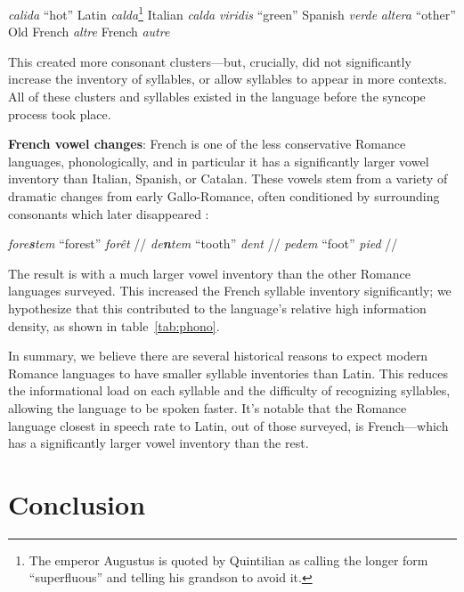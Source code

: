 \documentclass[12pt,twoside]{article}
\newcommand{\ipa}[1]{/\textipa{#1}/}
\newcommand{\yields}{\textrightarrow}
\begin{document}
\begin{exe}
\ex \emph{calida} ``hot'' \yields{} Latin \emph{calda}\footnote{The emperor Augustus is quoted by Quintilian \citep[I.6.19]{quintilian} as calling the longer form ``superfluous'' and telling his grandson to avoid it.} \yields{} Italian \emph{calda}
\ex \emph{viridis} ``green'' \yields{} Spanish \emph{verde}
\ex \emph{altera} ``other'' \yields{} Old French \emph{altre} \yields{} French \emph{autre}
\end{exe}

This created more consonant clusters---but, crucially, did not significantly increase the inventory of syllables, or allow syllables to appear in more contexts. All of these clusters and syllables existed in the language before the syncope process took place.

\textbf{French vowel changes}: French is one of the less conservative Romance languages, phonologically, and in particular it has a significantly larger vowel inventory than Italian, Spanish, or Catalan. These vowels stem from a variety of dramatic changes from early Gallo-Romance, often conditioned by surrounding consonants which later disappeared \citep{pope}:

\begin{exe}
\ex \emph{fore\textbf{s}tem} ``forest'' \yields{} \emph{for\^et} \ipa{fOKE}
\ex \emph{de\textbf{n}tem} ``tooth'' \yields{} \emph{dent} \ipa{d\~A}
\ex \emph{pedem} ``foot'' \yields{} \emph{pied} \ipa{pje}
\end{exe}

The result is with a much larger vowel inventory than the other Romance languages surveyed. This increased the French syllable inventory significantly; we hypothesize that this contributed to the language's relative high information density, as shown in table~\ref{tab:phono}.

In summary, we believe there are several historical reasons to expect modern Romance languages to have smaller syllable inventories than Latin. This reduces the informational load on each syllable and the difficulty of recognizing syllables, allowing the language to be spoken faster. It's notable that the Romance language closest in speech rate to Latin, out of those surveyed, is French---which has a significantly larger vowel inventory than the rest.

\section{Conclusion}
\label{sec:concl}
\end{document}
